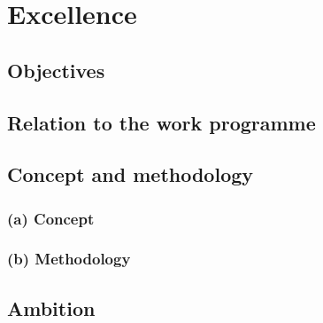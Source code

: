 \chapter{Excellence}



\section{Objectives}



\section{Relation to the work programme}



\section{Concept and methodology}

\newcommand{\cmsection}[1]{\bigskip\par\noindent\stepcounter{cmsec}\currentpdfbookmark{--- #1}{\thecmsec}{\bf \large \underline{#1}}\medskip}

\subsection*{(a) Concept}\label{concept}



\subsection*{(b) Methodology}



\section{Ambition}




